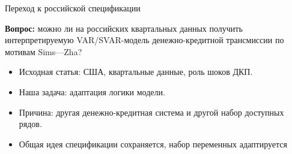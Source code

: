 \begin{frame}{Переход к российской спецификации}

\textbf{Вопрос:} можно ли на российских квартальных данных получить
интерпретируемую VAR/SVAR-модель денежно-кредитной трансмиссии по мотивам Sims---Zha?

\vspace{0.4cm}

\begin{itemize}
    \item Исходная статья: США, квартальные данные, роль шоков ДКП.
    \item Наша задача: адаптация логики модели.
    \item Причина: другая денежно-кредитная система и другой набор доступных рядов.
    \item Общая идея спецификации сохраняется, набор переменных адаптируется
\end{itemize}

\end{frame}